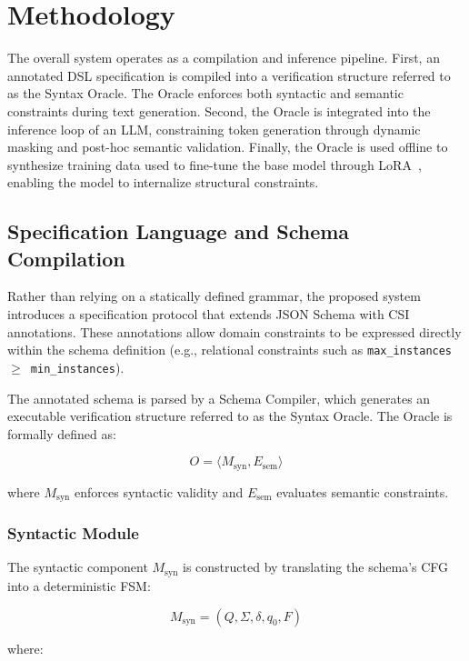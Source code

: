 \section{Methodology}
The overall system operates as a compilation and inference pipeline. First, an 
annotated DSL specification is compiled into a 
verification structure referred to as the Syntax Oracle. The Oracle 
enforces both syntactic and semantic constraints during text generation. Second, 
the Oracle is integrated into the inference loop of an LLM, 
constraining token generation through dynamic masking and post-hoc semantic 
validation. Finally, the Oracle is used offline to synthesize training data 
used to fine-tune the base model through LoRA~\cite{hu2021lora}, enabling 
the model to internalize structural constraints.

\subsection{Specification Language and Schema Compilation}
Rather than relying on a statically defined grammar, the proposed system 
introduces a specification protocol that extends JSON Schema with 
CSI annotations. These annotations allow 
domain constraints to be expressed directly within the schema definition (e.g., 
relational constraints such as \texttt{max\_instances $\ge$ min\_instances}).

The annotated schema is parsed by a Schema Compiler, which generates an 
executable verification structure referred to as the Syntax Oracle. The Oracle is 
formally defined as:

\begin{equation}
O = \langle M_{\text{syn}}, E_{\text{sem}} \rangle
\end{equation}

where $M_{\text{syn}}$ enforces syntactic validity and $E_{\text{sem}}$ 
evaluates semantic constraints.

\subsubsection{Syntactic Module}
The syntactic component $M_{\text{syn}}$ is constructed by translating the 
schema's CFG into a deterministic FSM:

\begin{equation}
M_{\text{syn}} = (Q, \Sigma, \delta, q_0, F)
\end{equation}

where:

